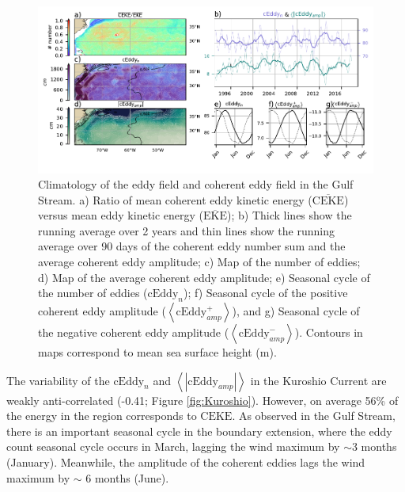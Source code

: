 \documentclass[draft,linenumbers]{agujournal2019}
\newcommand{\MEKE}{\overline{\textrm{EKE}}}
\newcommand{\MCEKE}{\overline{\textrm{CEKE}}}
\newcommand{\CEKE}{\textrm{CEKE}}
\newcommand{\cEddy}{\textrm{cEddy}}
\begin{document}
	\begin{figure}
	    \centering
	    \includegraphics[width=1\textwidth]{figures/regional_ratios_and_stats_V3_5.pdf}
	    \caption{Climatology of the eddy field and coherent eddy field in the Gulf Stream. a) Ratio of mean coherent eddy kinetic energy ($\MCEKE$) versus mean eddy kinetic energy ($\MEKE$); b) Thick lines show the running average over 2 years and thin lines show the running average over 90 days of the coherent eddy number sum and the average coherent eddy amplitude; c) Map of the number of eddies; d) Map of the average coherent eddy amplitude; e) Seasonal cycle of the number of eddies ($\cEddy_n$); f) Seasonal cycle of the positive coherent eddy amplitude ($\left<\cEddy_{amp}^+\right>$), and g) Seasonal cycle of the negative coherent eddy amplitude ($\left<\cEddy_{amp}^-\right>$). Contours in maps correspond to mean sea surface height (m).}
	    \label{fig:Gulf_Stream}
	\end{figure}

	The variability of the $\cEddy_{n}$ and $\left<|\cEddy_{amp}|\right>$ in the Kuroshio Current are weakly anti-correlated (-0.41; Figure \ref{fig:Kuroshio}). 
	However, on average 56\% of the energy in the region corresponds to $\CEKE$.
	As observed in the Gulf Stream, there is an important seasonal cycle in the boundary extension, where the eddy count seasonal cycle occurs in March, lagging the wind maximum by $\sim$3 months (January). Meanwhile, the amplitude of the coherent eddies lags the wind maximum by $\sim$ 6 months (June). 
\end{document}
